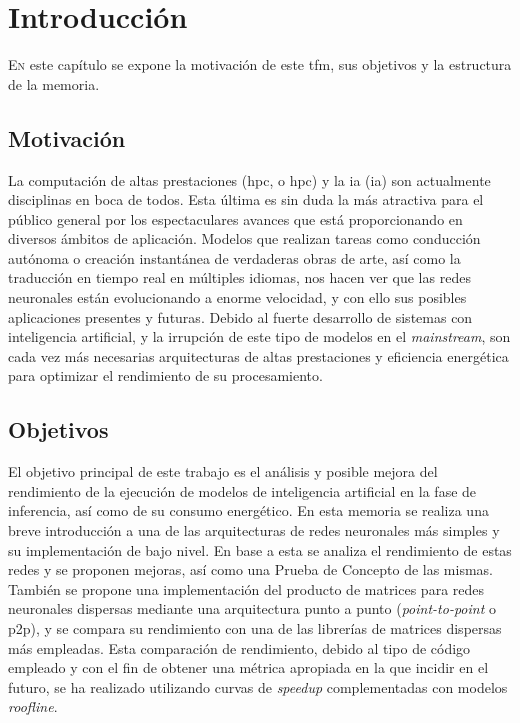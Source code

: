 \chapter{Introducción}
\label{chap:introducion}

\lettrine{E}{n} este capítulo se expone la motivación de este \acrlong{tfm}, sus objetivos y la estructura de la memoria.

\section{Motivación}
\label{sec:motivacion}
La computación de altas prestaciones (\acrshort{hpc}, o \acrlong{hpc}) y la \acrlong{ia} (\acrshort{ia}) son actualmente disciplinas en boca de todos. Esta última es sin duda la más atractiva para el público general por los espectaculares avances que está proporcionando en diversos ámbitos de aplicación. Modelos que realizan tareas como conducción autónoma o creación instantánea de verdaderas obras de arte, así como la traducción en tiempo real en múltiples idiomas, nos hacen ver que las redes neuronales están evolucionando a enorme velocidad, y con ello sus posibles aplicaciones presentes y futuras. Debido al fuerte desarrollo de sistemas con inteligencia artificial, y la irrupción de este tipo de modelos en el \textit{mainstream}, son cada vez más necesarias arquitecturas de altas prestaciones y eficiencia energética para optimizar el rendimiento de su procesamiento.

\section{Objetivos}
\label{sec:objetivos}
El objetivo principal de este trabajo es el análisis y posible mejora del rendimiento de la ejecución de modelos de inteligencia artificial en la fase de inferencia, así como de su consumo energético. En esta memoria se realiza una breve introducción a una de las arquitecturas de redes neuronales más simples y su implementación de bajo nivel. En base a esta se analiza el rendimiento de estas redes y se proponen mejoras, así como una Prueba de Concepto de las mismas. También se propone una implementación del producto de matrices para redes neuronales dispersas mediante una arquitectura punto a punto (\textit{point-to-point} o p2p), y se compara su rendimiento con una de las librerías de matrices dispersas más empleadas. Esta comparación de rendimiento, debido al tipo de código empleado y con el fin de obtener una métrica apropiada en la que incidir en el futuro, se ha realizado utilizando curvas de \textit{speedup} complementadas con modelos \textit{roofline}.

